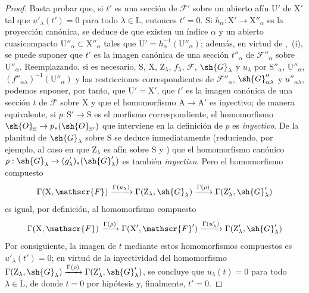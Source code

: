 \begin{proof}
Basta probar que, si $t'$ es una sección de $\mathscr{F}'$ sobre un abierto afín $\mathrm{U}'$ de $\mathrm{X}'$ tal que $u'_\lambda(t')=0$ para todo $\lambda\in\mathrm{L}$, entonces $t'=0$.
Si $h_\alpha:\mathrm{X}'\to\mathrm{X}''_\alpha$ es la proyección canónica,
se deduce de  que existen un índice $\alpha$ y un abierto cuasicompacto $\mathrm{U}''_\alpha\subset\mathrm{X}''_\alpha$ tales que $\mathrm{U}'=h_\alpha^{-1}(\mathrm{U}''_\alpha)$; además, en virtud de ,~(i), se puede suponer que $t'$ es la imagen canónica de una sección $t''_\alpha$ de $\mathscr{F}''_\alpha$ sobre $\mathrm{U}''_\alpha$.
Reemplazando, si es necesario, $\mathrm{S}$, $\mathrm{X}$, $\mathrm{Z}_\lambda$, $f_\lambda$, $\mathscr{F}$, $\sh{G}_\lambda$ y $u_\lambda$ por $\mathrm{S}''_\alpha$, $\mathrm{U}''_\alpha$, $(f''_{\alpha\lambda})^{-1}(\mathrm{U}''_\alpha)$ y las restricciones correspondientes de $\mathscr{F}''_\alpha$, $\sh{G}''_{\alpha\lambda}$ y $u''_{\alpha\lambda}$, podemos suponer, por tanto, que $\mathrm{U}'=\mathrm{X}'$, que $t'$ es la imagen canónica de una sección $t$ de $\mathscr{F}$ sobre $\mathrm{X}$ y que el homomorfismo $\mathrm{A}\to\mathrm{A}'$ es inyectivo; de manera equivalente, si $p:\mathrm{S}'\to\mathrm{S}$ es el morfismo correspondiente, el homomorfismo $\sh{O}_\mathrm{S}\to p_*(\sh{O}_{\mathrm{S}'})$ que interviene en la definición de $p$ es \emph{inyectivo}.
De la planitud de $\sh{G}_\lambda$ sobre $\mathrm{S}$ se deduce inmediatamente (reduciendo, por ejemplo, al caso en que $\mathrm{Z}_\lambda$ es afín sobre $\mathrm{S}$  y ) que el homomorfismo canónico $\rho:\sh{G}_\lambda\to(g'_\lambda)_*(\sh{G}'_\lambda)$ es también \emph{inyectivo}.
Pero el homomorfismo compuesto
\[
  \Gamma(\mathrm{X},\mathscr{F})\xrightarrow{\Gamma(u_\lambda)}\Gamma(\mathrm{Z}_\lambda,\sh{G}_\lambda)\xrightarrow{\Gamma(\rho)}\Gamma(\mathrm{Z}'_\lambda,\sh{G}'_\lambda)
\]
es igual, por definición, al homomorfismo compuesto
\[
  \Gamma(\mathrm{X},\mathscr{F})\xrightarrow{\Gamma(\rho)}\Gamma(\mathrm{X}',\mathscr{F}')\xrightarrow{\Gamma(u'_\lambda)}\Gamma(\mathrm{Z}'_\lambda,\sh{G}'_\lambda)
\]
Por consiguiente, la imagen de $t$ mediante estos homomorfismos compuestos es $u'_\lambda(t')=0$; en virtud de la inyectividad del homomorfismo $\Gamma(\mathrm{Z}_\lambda,\sh{G}_\lambda)\xrightarrow{\Gamma(\rho)}\Gamma(\mathrm{Z}'_\lambda,\sh{G}'_\lambda)$, se concluye que $u_\lambda(t)=0$ para todo $\lambda\in\mathrm{L}$, de donde $t=0$ por hipótesis y, finalmente, $t'=0$.
\end{proof}

